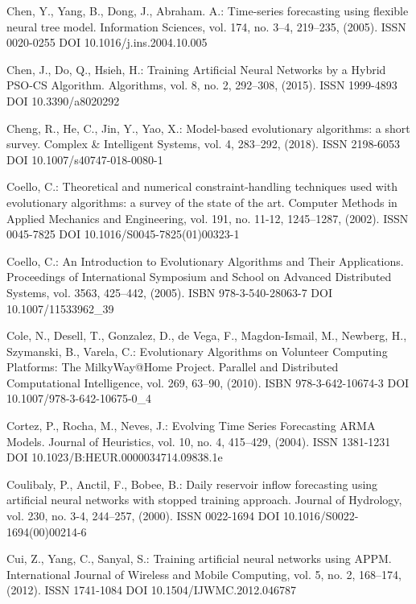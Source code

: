 \begin{thebibliography}{99.}
 Chen, Y., Yang, B., Dong, J., Abraham. A.: Time-series forecasting using flexible neural tree model. Information Sciences, vol. 174, no. 3--4, 219--235, (2005). ISSN 0020-0255 DOI 10.1016/j.ins.2004.10.005

 Chen, J., Do, Q., Hsieh, H.: Training Artificial Neural Networks by a Hybrid PSO-CS Algorithm. Algorithms, vol. 8, no. 2, 292--308, (2015). ISSN 1999-4893 DOI 10.3390/a8020292

 Cheng, R., He, C., Jin, Y., Yao, X.: Model-based evolutionary algorithms: a short survey. Complex \& Intelligent Systems, vol. 4, 283--292, (2018). ISSN 2198-6053 DOI 10.1007/s40747-018-0080-1

 Coello, C.: Theoretical and numerical constraint-handling techniques used with evolutionary algorithms: a survey of the state of the art. Computer Methods in Applied Mechanics and Engineering, vol. 191, no. 11-12, 1245--1287, (2002). ISSN 0045-7825 DOI 10.1016/S0045-7825(01)00323-1

 Coello, C.: An Introduction to Evolutionary Algorithms and Their Applications. Proceedings of International Symposium and School on Advanced Distributed Systems, vol. 3563, 425--442, (2005). ISBN 978-3-540-28063-7 DOI 10.1007/11533962\_39

 Cole, N., Desell, T., Gonzalez, D., de Vega, F., Magdon-Ismail, M., Newberg, H., Szymanski, B., Varela, C.:  Evolutionary Algorithms on Volunteer Computing Platforms: The MilkyWay@Home Project. Parallel and Distributed Computational Intelligence, vol. 269, 63--90, (2010). ISBN 978-3-642-10674-3 DOI 10.1007/978-3-642-10675-0\_4

 Cortez, P., Rocha, M., Neves, J.: Evolving Time Series Forecasting ARMA Models. Journal of Heuristics, vol. 10, no. 4, 415--429, (2004). ISSN 1381-1231 DOI 10.1023/B:HEUR.0000034714.09838.1e

 Coulibaly, P., Anctil, F., Bobee, B.: Daily reservoir inflow forecasting using artificial neural networks with stopped training approach. Journal of Hydrology, vol. 230, no. 3-4, 244--257, (2000). ISSN 0022-1694 DOI 10.1016/S0022-1694(00)00214-6

 Cui, Z., Yang, C., Sanyal, S.: Training artificial neural networks using APPM. International Journal of Wireless and Mobile Computing, vol. 5, no. 2, 168--174, (2012). ISSN 1741-1084 DOI 10.1504/IJWMC.2012.046787


\end{thebibliography}
